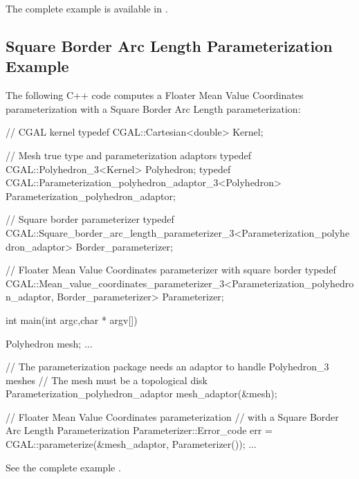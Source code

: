 The complete example is available in
.


\subsection{Square Border Arc Length Parameterization Example}

The following C++ code computes a Floater Mean Value Coordinates
parameterization with a Square Border Arc Length parameterization:

\begin{ccExampleCode}

// CGAL kernel
typedef CGAL::Cartesian<double>                         Kernel;

// Mesh true type and parameterization adaptors
typedef CGAL::Polyhedron_3<Kernel>                      Polyhedron;
typedef CGAL::Parameterization_polyhedron_adaptor_3<Polyhedron>
                                                        Parameterization_polyhedron_adaptor;

// Square border parameterizer
typedef CGAL::Square_border_arc_length_parameterizer_3<Parameterization_polyhedron_adaptor>
                                                        Border_parameterizer;

// Floater Mean Value Coordinates parameterizer with square border
typedef CGAL::Mean_value_coordinates_parameterizer_3<Parameterization_polyhedron_adaptor,
                                                     Border_parameterizer>
                                                        Parameterizer;

int main(int argc,char * argv[])
{
    Polyhedron mesh;
    ...

    // The parameterization package needs an adaptor to handle Polyhedron_3 meshes
    // The mesh must be a topological disk
    Parameterization_polyhedron_adaptor mesh_adaptor(&mesh);

    // Floater Mean Value Coordinates parameterization
    // with a Square Border Arc Length Parameterization
    Parameterizer::Error_code err = CGAL::parameterize(&mesh_adaptor, Parameterizer());
    ...
}

\end{ccExampleCode}

See the complete example .

